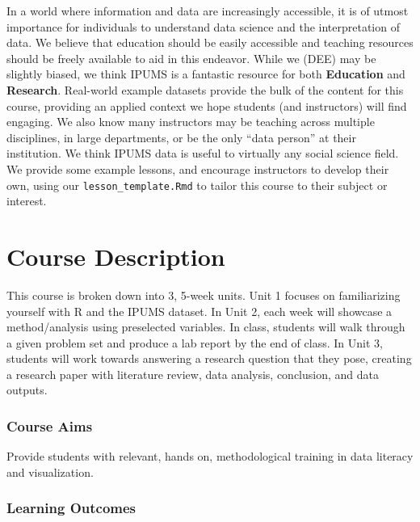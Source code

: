 \documentclass[
]{book}
\begin{document}
In a world where information and data are increasingly accessible, it is of utmost importance for individuals to understand data science and the interpretation of data. We believe that education should be easily accessible and teaching resources should be freely available to aid in this endeavor. While we (DEE) may be slightly biased, we think IPUMS is a fantastic resource for both \textbf{Education} and \textbf{Research}. Real-world example datasets provide the bulk of the content for this course, providing an applied context we hope students (and instructors) will find engaging. We also know many instructors may be teaching across multiple disciplines, in large departments, or be the only ``data person'' at their institution. We think IPUMS data is useful to virtually any social science field. We provide some example lessons, and encourage instructors to develop their own, using our \texttt{lesson\_template.Rmd} to tailor this course to their subject or interest.

\hypertarget{course-description}{%
\chapter*{Course Description}\label{course-description}}

This course is broken down into 3, 5-week units. Unit 1 focuses on familiarizing yourself with R and the IPUMS dataset. In Unit 2, each week will showcase a method/analysis using preselected variables. In class, students will walk through a given problem set and produce a lab report by the end of class. In Unit 3, students will work towards answering a research question that they pose, creating a research paper with literature review, data analysis, conclusion, and data outputs.

\hypertarget{course-aims}{%
\subsection*{Course Aims}\label{course-aims}}

Provide students with relevant, hands on, methodological training in data literacy and visualization.

\hypertarget{learning-outcomes}{%
\subsection*{Learning Outcomes}\label{learning-outcomes}}
\end{document}
